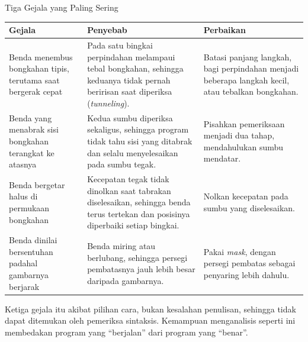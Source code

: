 \documentclass[aspectratio=169,10pt]{beamer}
\begin{document}
\begin{frame}{Tiga Gejala yang Paling Sering}
{\scriptsize
\renewcommand{\arraystretch}{1.10}
\begin{tabularx}{\textwidth}{@{}>{\raggedright\arraybackslash}p{3.9cm}
    >{\raggedright\arraybackslash}p{5.0cm}
    >{\raggedright\arraybackslash}X@{}}
\toprule
\textbf{Gejala} & \textbf{Penyebab} & \textbf{Perbaikan} \\
\midrule
Benda menembus bongkahan tipis, terutama saat bergerak cepat &
  Pada satu bingkai perpindahan melampaui tebal bongkahan, sehingga keduanya
  tidak pernah beririsan saat diperiksa (\emph{tunneling}). &
  Batasi panjang langkah, bagi perpindahan menjadi beberapa langkah kecil, atau
  tebalkan bongkahan. \\
Benda yang menabrak sisi bongkahan terangkat ke atasnya &
  Kedua sumbu diperiksa sekaligus, sehingga program tidak tahu sisi yang
  ditabrak dan selalu menyelesaikan pada sumbu tegak. &
  Pisahkan pemeriksaan menjadi dua tahap, mendahulukan sumbu mendatar. \\
Benda bergetar halus di permukaan bongkahan &
  Kecepatan tegak tidak dinolkan saat tabrakan diselesaikan, sehingga benda
  terus tertekan dan posisinya diperbaiki setiap bingkai. &
  Nolkan kecepatan pada sumbu yang diselesaikan. \\
Benda dinilai bersentuhan padahal gambarnya berjarak &
  Benda miring atau berlubang, sehingga persegi pembatasnya jauh lebih besar
  daripada gambarnya. &
  Pakai \emph{mask}, dengan persegi pembatas sebagai penyaring lebih dahulu. \\
\bottomrule
\end{tabularx}}
\vspace{0.12cm}
\begin{kotak}
Ketiga gejala itu akibat pilihan cara, bukan kesalahan penulisan, sehingga
tidak dapat ditemukan oleh pemeriksa sintaksis. Kemampuan menganalisis seperti
ini membedakan program yang ``berjalan'' dari program yang ``benar''.
\end{kotak}
\end{frame}
\end{document}
